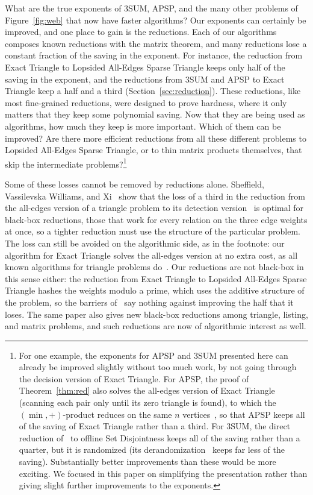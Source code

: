 What are the true exponents of $3$SUM, APSP, and the many other problems of Figure~\ref{fig:web} that now have faster algorithms? Our exponents can certainly be improved, and one place to gain is the reductions. Each of our algorithms composes known reductions with the matrix theorem, and many reductions lose a constant fraction of the saving in the exponent. For instance, the reduction from Exact Triangle to Lopsided All-Edges Sparse Triangle keeps only half of the saving in the exponent, and the reductions from $3$SUM and APSP to Exact Triangle keep a half and a third (Section~\ref{sec:reduction}). These reductions, like most fine-grained reductions, were designed to prove hardness, where it only matters that they keep some polynomial saving. Now that they are being used as algorithms, how much they keep is more important. Which of them can be improved? Are there more efficient reductions from all these different problems to Lopsided All-Edges Sparse Triangle, or to thin matrix products themselves, that skip the intermediate problems?\footnote{\label{footnote:improvements}For one example, the exponents for APSP and $3$SUM presented here can already be improved slightly without too much work, by not going through the decision version of Exact Triangle. For APSP, the proof of Theorem~\ref{thm:red} also solves the all-edges version of Exact Triangle (scanning each pair only until its zero triangle is found), to which the $(\min,+)$-product reduces on the same $n$ vertices~\cite{VW10,VW18,VW13}, so that APSP keeps all of the saving of Exact Triangle rather than a third. For $3$SUM, the direct reduction of~\cite{KPP16} to offline Set Disjointness keeps all of the saving rather than a quarter, but it is randomized (its derandomization~\cite{FKP24} keeps far less of the saving). Substantially better improvements than these would be more exciting. We focused in this paper on simplifying the presentation rather than giving slight further improvements to the exponents.} 

Some of these losses cannot be removed by reductions alone. Sheffield, Vassilevska Williams, and Xi~\cite{SVX27} show that the loss of a third in the reduction from the all-edges version of a triangle problem to its detection version~\cite{VW10,VW18} is optimal for black-box reductions, those that work for every relation on the three edge weights at once, so a tighter reduction must use the structure of the particular problem. The loss can still be avoided on the algorithmic side, as in the footnote: our algorithm for Exact Triangle solves the all-edges version at no extra cost, as all known algorithms for triangle problems do~\cite{SVX27}. Our reductions are not black-box in this sense either: the reduction from Exact Triangle to Lopsided All-Edges Sparse Triangle hashes the weights modulo a prime, which uses the additive structure of the problem, so the barriers of~\cite{SVX27} say nothing against improving the half that it loses. The same paper also gives new black-box reductions among triangle, listing, and matrix problems, and such reductions are now of algorithmic interest as well.


